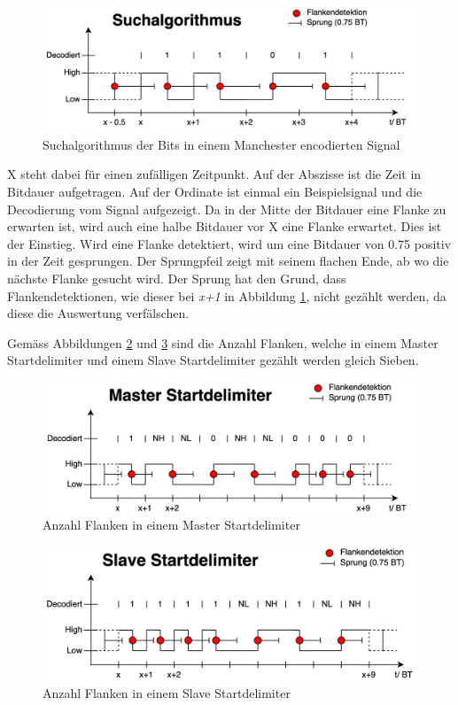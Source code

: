 \begin{figure}[H]
    \centering
    \includegraphics[width=0.9\linewidth]{Figures/Chap3/Busauslastung/Suchalgorithmus_Bits.png}
    \caption{Suchalgorithmus der Bits in einem Manchester encodierten Signal}
    \label{fig:Suchalgo_Bits}
\end{figure}

X steht dabei für einen zufälligen Zeitpunkt. Auf der Abszisse ist die Zeit in Bitdauer aufgetragen. Auf der Ordinate ist einmal ein Beispielsignal und die Decodierung vom Signal aufgezeigt. Da in der Mitte der Bitdauer eine Flanke zu erwarten ist, wird auch eine halbe Bitdauer vor X eine Flanke erwartet. Dies ist der Einstieg. Wird eine Flanke detektiert, wird um eine Bitdauer von 0.75 positiv in der Zeit gesprungen. Der Sprungpfeil zeigt mit seinem flachen Ende, ab wo die nächste Flanke gesucht wird. Der Sprung hat den Grund, dass Flankendetektionen, wie dieser bei \textit{x+1} in Abbildung \ref{fig:Suchalgo_Bits}, nicht gezählt werden, da diese die Auswertung verfälschen.

Gemäss Abbildungen \ref{fig:MasterStartdel} und \ref{fig:SlaveStartdel} sind die Anzahl Flanken, welche in einem Master Startdelimiter und einem Slave Startdelimiter gezählt werden gleich Sieben.

\begin{figure}[H]
    \centering
    \includegraphics[width=0.9\linewidth]{Figures/Chap3/Busauslastung/Master_Startdel.png}
    \caption{Anzahl Flanken in einem Master Startdelimiter}
    \label{fig:MasterStartdel}
\end{figure}

\begin{figure}[H]
    \centering
    \includegraphics[width=0.9\linewidth]{Figures/Chap3/Busauslastung/Slave_Startdel.png}
    \caption{Anzahl Flanken in einem Slave Startdelimiter}
    \label{fig:SlaveStartdel}
\end{figure}


